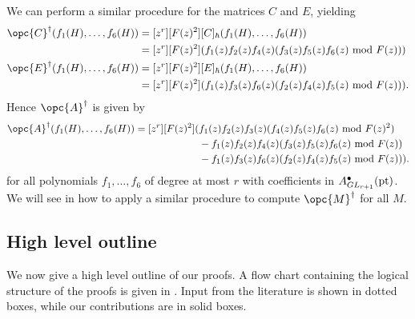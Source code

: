 \documentclass[12pt]{amsart}
\newcommand{\pt}{{\rm pt}}
\theoremstyle{plain}
\theoremstyle{definition}
\theoremstyle{remark}
\begin{document}
We can perform a similar procedure for the matrices $C$ and $E$, yielding
\begin{align*}
\opc{C}^{\dagger}(f_1(H), \ldots, f_{6}(H)) &= [z^r][F(z)^2][C]_\hbar(f_1(H), \ldots, f_{6}(H)) \\
&= [z^r][F(z)^2](f_1(z)f_2(z)f_4(z) (f_3(z) f_{5}(z) f_{6}(z)\text{ mod }F(z))) \\
\opc{E}^{\dagger}(f_1(H), \ldots, f_{6}(H)) &= [z^r][F(z)^2][E]_\hbar(f_1(H), \ldots, f_{6}(H)) \\
&= [z^r][F(z)^2](f_1(z)f_3(z)f_6(z) (f_2(z) f_{4}(z) f_{5}(z)\text{ mod }F(z))).
\end{align*}
Hence $\opc{A}^\dagger$ is given by
\begin{align*}
\opc{A}^{\dagger}(f_1(H), \ldots, f_{6}(H)) = [z^r][F(z)^2]( &f_1(z)f_2(z)f_3(z) (f_4(z) f_{5}(z) f_{6}(z)\text{ mod }F(z)^2)\\
&-f_1(z)f_2(z)f_4(z) (f_3(z) f_{5}(z) f_{6}(z)\text{ mod }F(z)) \\
&-f_1(z)f_3(z)f_6(z) (f_2(z) f_{4}(z) f_{5}(z)\text{ mod }F(z)) ) .
\end{align*}
for all polynomials $f_1, \ldots, f_{6}$ of degree at most $r$ with coefficients in $A^\bullet_{GL_{r+1}}(\pt)$. We will see in  how to apply a similar procedure to compute $\opc{M}^\dagger$ for all $M$.



\subsection{High level outline}
We now give a high level outline of our proofs. A flow chart containing the logical structure of the proofs is given in . Input from the literature is shown in dotted boxes, while our contributions are in solid boxes. 
\end{document}
